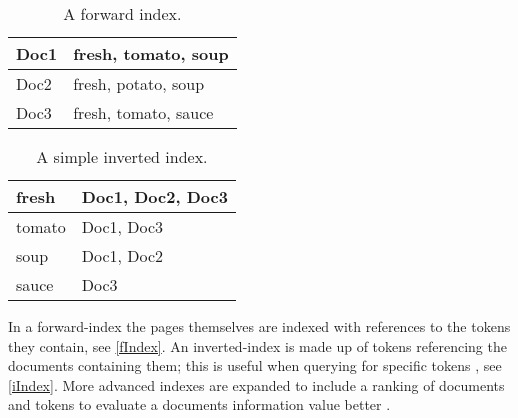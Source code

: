 \begin{minipage}{.40\textwidth}
  \centering
  \begin{table}[H]
	\centering
    \begin{tabular}{|l|l|}
\hline
Doc1 & fresh, tomato, soup \\ \hline
Doc2 & fresh, potato, soup \\ \hline
Doc3 & fresh, tomato, sauce \\ \hline
	\end{tabular}
	\caption{A forward index.}
	\label{fIndex}
  \end{table}
\end{minipage}
\begin{minipage}{0.5\textwidth}
  \centering
  \begin{table}[H]
	\centering
    \begin{tabular}{|l|l|}
\hline
fresh & Doc1, Doc2, Doc3 \\ \hline
tomato & Doc1, Doc3 \\ \hline
soup & Doc1, Doc2 \\ \hline
sauce & Doc3 \\ \hline
	\end{tabular}
	\caption{A simple inverted index.}
	\label{iIndex}
  \end{table}
\end{minipage}\nl
In a forward-index the pages themselves are indexed with references to the
tokens they contain, see \autoref{fIndex}. An inverted-index is made up of
tokens referencing the documents containing them; this is useful when querying
for specific tokens \citep{Index3}, see \autoref{iIndex}. More advanced indexes
are expanded to include a ranking of documents and tokens to evaluate a
documents information value better \citep[P. 109]{manning2008introduction}.
